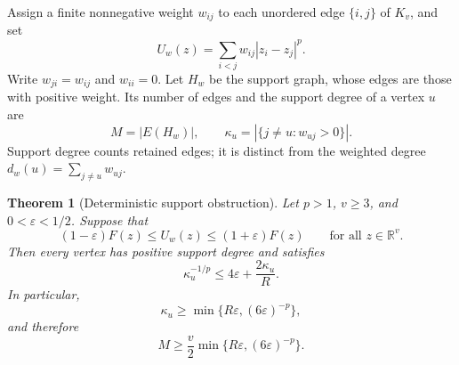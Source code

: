 \documentclass[11pt]{article}
\theoremstyle{spaced}
\newtheorem{theorem}{Theorem}[section]
\numberwithin{equation}{section}
\newcommand{\R}{\mathbb{R}}
\begin{document}
Assign a finite nonnegative weight $w_{ij}$ to each unordered edge
$\{i,j\}$ of $K_v$, and set
\begin{equation}\label{eq:weighted-energy}
 U_w(z)=\sum_{i<j}w_{ij}|z_i-z_j|^p.
\end{equation}
Write $w_{ji}=w_{ij}$ and $w_{ii}=0$. Let $H_w$ be the support graph,
whose edges are those with positive weight. Its number of edges and the
support degree of a vertex $u$ are
\[
 M=|E(H_w)|,
 \qquad
 \kappa_u=|\{j\ne u:w_{uj}>0\}|.
\]
Support degree counts retained edges; it is distinct from the weighted
degree $d_w(u)=\sum_{j\ne u}w_{uj}$.

\begin{theorem}[Deterministic support obstruction]\label{thm:weighted}
Let $p>1$, $v\ge3$, and $0<\varepsilon<1/2$. Suppose that
\begin{equation}\label{eq:weighted-embedding}
 (1-\varepsilon)F(z)\le U_w(z)\le(1+\varepsilon)F(z)
 \qquad\text{for all }z\in\R^v.
\end{equation}
Then every vertex has positive support degree and satisfies
\begin{equation}\label{eq:support-necessary}
 \kappa_u^{-1/p}\le4\varepsilon+\frac{2\kappa_u}{R}.
\end{equation}
In particular,
\begin{equation}\label{eq:support-degree}
 \kappa_u\ge
 \min\{R\varepsilon,(6\varepsilon)^{-p}\},
\end{equation}
and therefore
\begin{equation}\label{eq:weighted-support-bound}
 M\ge\frac v2\min\{R\varepsilon,(6\varepsilon)^{-p}\}.
\end{equation}
\end{theorem}
\end{document}
